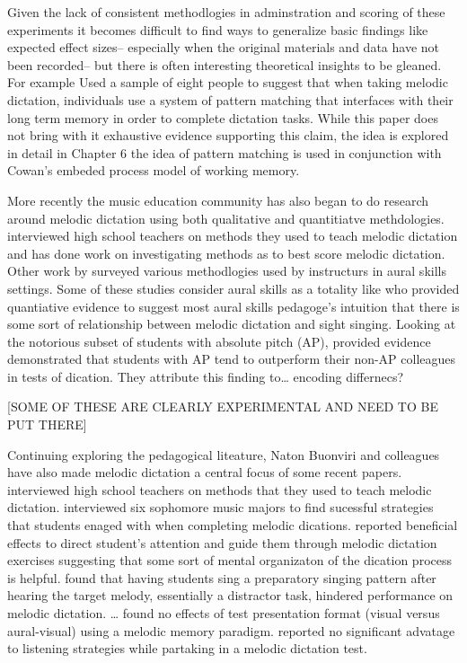 \documentclass[]{book}
\theoremstyle{definition}
\theoremstyle{definition}
\theoremstyle{definition}
\theoremstyle{remark}
\begin{document}
Given the lack of consistent methodlogies in adminstration and scoring
of these experiments it becomes difficult to find ways to generalize
basic findings like expected effect sizes-- especially when the original
materials and data have not been recorded-- but there is often
interesting theoretical insights to be gleaned. For example
\citep{ouraConstructingRepresentationMelody1991a} Used a sample of eight
people to suggest that when taking melodic dictation, individuals use a
system of pattern matching that interfaces with their long term memory
in order to complete dictation tasks. While this paper does not bring
with it exhaustive evidence supporting this claim, the idea is explored
in detail in Chapter 6 the idea of pattern matching is used in
conjunction with Cowan's embeded process model of working memory.

More recently the music education community has also began to do
research around melodic dictation using both qualitative and
quantitiatve methdologies. \citep{paneyTeachingMelodicDictation2014}
interviewed high school teachers on methods they used to teach melodic
dictation and \citep{gillespieMelodicDictationScoring2001} has done work
on investigating methods as to best score melodic dictation. Other work
by \citep{pembrookSendHelpAural1990} surveyed various methodlogies used
by instructurs in aural skills settings. Some of these studies consider
aural skills as a totality like
\citep{norrisRelationshipSightSinging2003} who provided quantiative
evidence to suggest most aural skills pedagoge's intuition that there is
some sort of relationship between melodic dictation and sight singing.
Looking at the notorious subset of students with absolute pitch (AP),
\citep{dooleyAbsolutePitchCorrelates2010} provided evidence demonstrated
that students with AP tend to outperform their non-AP colleagues in
tests of dication. They attribute this finding to\ldots{} encoding
differnecs?

{[}SOME OF THESE ARE CLEARLY EXPERIMENTAL AND NEED TO BE PUT THERE{]}

Continuing exploring the pedagogical liteature, Naton Buonviri and
colleagues have also made melodic dictation a central focus of some
recent papers. \citet{paneyTeachingMelodicDictation2014} interviewed
high school teachers on methods that they used to teach melodic
dictation. \citet{buonviriEffectsMusicNotation2015} interviewed six
sophomore music majors to find sucessful strategies that students enaged
with when completing melodic dications.
\citet{paneyEffectDirectingAttention2016} reported beneficial effects to
direct student's attention and guide them through melodic dictation
exercises suggesting that some sort of mental organizaton of the
dication process is helpful.
\citet{buonviriMelodicDictationInstruction2015} found that having
students sing a preparatory singing pattern after hearing the target
melody, essentially a distractor task, hindered performance on melodic
dictation. \citet{buonviriEffectsPreparatorySinging2015}\ldots{}
\citet{buonviriEffectsMusicNotation2015} found no effects of test
presentation format (visual versus aural-visual) using a melodic memory
paradigm. \citet{buonviriEffectsTwoListening2017} reported no
significant advatage to listening strategies while partaking in a
melodic dictation test.
\end{document}
